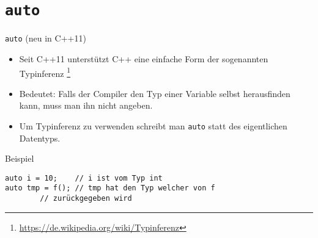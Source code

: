 \documentclass[presentation]{beamer}
\begin{document}
\section{\texttt{auto}}
\label{sec:orge85c5ac}
\begin{frame}[label={sec:org168d82d},fragile]{{\color{solarizedYellow}\texttt{auto}} (neu in C++11)}
 \begin{itemize}
\item Seit C++11 unterstützt C++ eine einfache Form der sogenannten
\alert{Typinferenz} \footnote{\href{https://de.wikipedia.org/wiki/Typinferenz}{https://de.wikipedia.org/wiki/Typinferenz}}
\item Bedeutet: Falls der Compiler den Typ einer Variable selbst
herausfinden kann, muss man ihn nicht angeben.
\item Um Typinferenz zu verwenden schreibt man {\color{solarizedYellow}\verb!auto!} statt des
eigentlichen Datentyps.
\end{itemize}
\begin{block}{Beispiel}
\begin{verbatim}
auto i = 10;    // i ist vom Typ int
auto tmp = f(); // tmp hat den Typ welcher von f
		// zurückgegeben wird
\end{verbatim}
\end{block}
\end{frame}
\end{document}
